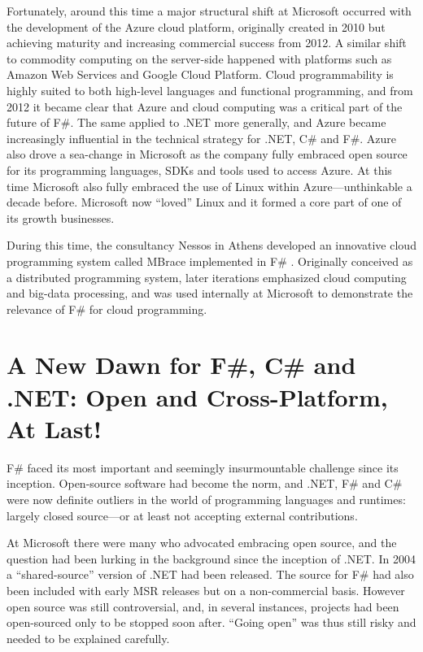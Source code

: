 \documentclass[acmsmall,screen]{acmart}
\begin{document}
Fortunately, around this time a major structural shift at Microsoft occurred with the development of the Azure cloud platform,
originally created in 2010 but achieving maturity and increasing commercial success from 2012.  A similar shift to commodity
computing on the server-side happened with platforms such as Amazon Web Services and Google Cloud Platform.   Cloud
programmability is highly suited to both high-level languages and functional programming, and from 2012 it became clear that
Azure and cloud computing was a critical part of the future of F\#. The same applied to .NET more generally, and Azure
became increasingly influential in the technical strategy for .NET, C\# and F\#.  Azure also drove a sea-change in Microsoft
as the company fully embraced open source for its programming languages, SDKs and tools used to access Azure. At this
time Microsoft also fully embraced the use of Linux within Azure---unthinkable a decade before.  Microsoft now “loved” Linux
and it formed a core part of one of its growth businesses.

During this time, the consultancy Nessos in Athens developed an innovative cloud programming system called MBrace
implemented in F\# \citep{Dzik2013}. Originally conceived as a distributed
programming system, later iterations emphasized cloud computing and big-data processing, and was used internally at
Microsoft to demonstrate the relevance of F\# for cloud programming. 


\section*{A New Dawn for F\#, C\# and .NET: Open and Cross-Platform, At Last!}

F\# faced its most important and seemingly insurmountable challenge since its inception. Open-source software had
become the norm, and .NET, F\# and C\# were now definite outliers in the world of programming languages and
runtimes: largely closed source---or at least not accepting external contributions.  

At Microsoft there were many who advocated embracing open source, and the question had been lurking in the
background since the inception of .NET. In 2004 a “shared-source” version of .NET had been released. The source
for F\# had also been included with early MSR releases but on a non-commercial basis. However open source was
still controversial, and, in several instances, projects had been open-sourced only to be stopped soon
after.  “Going open” was thus still risky and needed to be explained carefully. 
\end{document}
